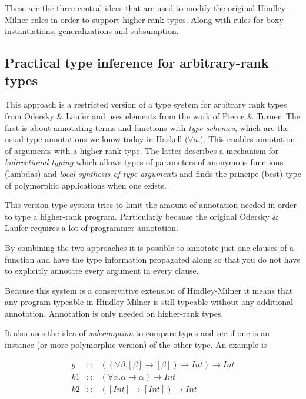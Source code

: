 These are the three central ideas that are used to modify the original Hindley-Milner rules in order to support higher-rank types. Along with rules for boxy instantiations, generalizations and subsumption.

\subsection{Practical type inference for arbitrary-rank types\cite{boring}}
This approach is a restricted version of a type system for arbitrary rank types from Odersky \& Laufer\cite{odesky} and uses elements from the work of Pierce \& Turner\cite{pierce}. The first is about annotating terms and functions with \textit{type schemes}, which are the usual type annotations we know today in Haskell ($\forall a.$). This enables annotation of arguments with a higher-rank type. The latter describes a mechanism for \textit{bidirectional typing} which allows types of parameters of anonymous functions (lambdas) and \textit{local synthesis of type arguments} and finds the principe (best) type of polymorphic applications when one exists.

This version type system tries to limit the amount of annotation needed in order to type a higher-rank program. Particularly because the original Odersky \& Laufer\cite{odesky} requires a lot of programmer annotation.

By combining the two approaches it is possible to annotate just one clauses of a function and have the type information propagated along so that you do not have to explicitly annotate every argument in every clause.

Because this system is a conservative extension of Hindley-Milner it means that any program typeable in Hindley-Milner is still typeable without any additional annotation. Annotation is only needed on higher-rank types.

It also uses the idea of \textit{subsumption} to compare types and see if one is an instance (or more polymorphic version) of the other type. An example is

\begin{eqnarray*}
g  &::& ((\forall\beta.[\beta] \rightarrow [\beta]) \rightarrow Int) \rightarrow Int \\
k1 &::& (\forall\alpha. \alpha \rightarrow \alpha) \rightarrow Int\\
k2 &::& ([Int] \rightarrow [Int]) \rightarrow Int
\end{eqnarray*}

